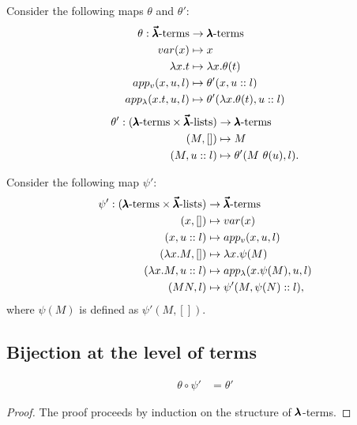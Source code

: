 \begin{definition}
  Consider the following maps $\theta$ and $\theta'$:
  \begin{align*}
    \theta : \pmb{\vec \lambda} \text{-terms} &\to \pmb{\lambda} \text{-terms} \\
    var(x) &\mapsto x \\
    \lambda x . t &\mapsto \lambda x . \theta(t) \\
    app_v (x, u, l) &\mapsto \theta'(x, u::l) \\
    app_\lambda (x. t, u, l) &\mapsto \theta'(\lambda x . \theta(t), u::l)
  \end{align*}
  \begin{align*}
    \theta' : (\pmb{\lambda} \text{-terms} \times \pmb{\vec \lambda} \text{-lists}) & \to \pmb{\lambda} \text{-terms} \\
    (M, []) &\mapsto M \\
    (M, u::l) &\mapsto \theta'(M \ \theta(u), l).
  \end{align*}
\end{definition}
  
\begin{definition}
  Consider the following map $\psi'$:
  \begin{align*}
    \psi' : (\pmb{\lambda} \text{-terms} \times \pmb{\vec \lambda} \text{-lists}) &\to \pmb{\vec \lambda} \text{-terms} \\
    (x, []) &\mapsto var(x) \\
    (x, u::l) &\mapsto app_v (x, u, l) \\
    (\lambda x . M, []) &\mapsto \lambda x . \psi(M) \\
    (\lambda x . M, u::l) &\mapsto app_\lambda (x . \psi(M), u, l) \\
    (M N, l) &\mapsto \psi'(M, \psi(N)::l),              
  \end{align*}
  where $\psi(M)$ is defined as $\psi'(M, [])$.
\end{definition}

\subsection{Bijection at the level of terms}

\begin{lemma}
  \label{theta_inversion_lemma}
  \begin{align*}
    \theta \circ \psi' &= \theta'    
  \end{align*}
\end{lemma}
\begin{proof}
  The proof proceeds by induction on the structure of $\pmb{\lambda}$-terms.
\end{proof}


